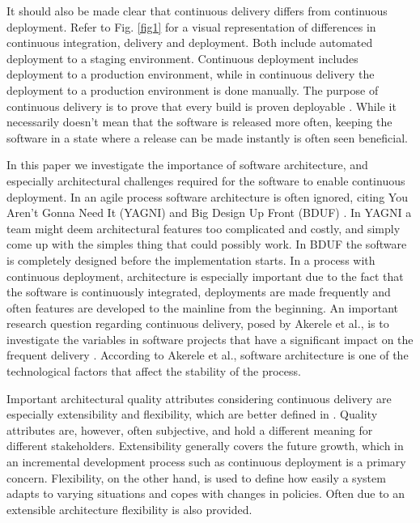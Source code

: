 \documentclass[conference]{IEEEtran}
\begin{document}
It should also be made clear that continuous delivery differs from continuous deployment. Refer to Fig. \ref{fig1} for a visual representation of differences in continuous integration, delivery and deployment. Both include automated deployment to a staging environment. Continuous deployment includes deployment to a production environment, while in continuous delivery the deployment to a production environment is done manually. The purpose of continuous delivery is to prove that every build is proven deployable \cite{cdbook}. While it necessarily doesn't mean that the software is released more often, keeping the software in a state where a release can be made instantly is often seen beneficial.

In this paper we investigate the importance of software architecture, and especially architectural challenges required for the software to enable continuous deployment. In an agile process software architecture is often ignored, citing You Aren't Gonna Need It (YAGNI) and Big Design Up Front (BDUF) \cite{kruchten2010software}. In YAGNI a team might deem architectural features too complicated and costly, and simply come up with the simples thing that could possibly work. In BDUF the software is completely designed before the implementation starts. In a process with continuous deployment, architecture is especially important due to the fact that the software is continuously integrated, deployments are made frequently and often features are developed to the mainline from the beginning. An important research question regarding continuous delivery, posed by Akerele et al., is to investigate the variables in software projects that have a significant impact on the frequent delivery \cite{6612879}. According to Akerele et al., software architecture is one of the technological factors that affect the stability of the process. 

Important architectural quality attributes considering continuous delivery are especially extensibility and flexibility, which are better defined in \cite{kaisler2005software}. Quality attributes are, however, often subjective, and hold a different meaning for different stakeholders. Extensibility generally covers the future growth, which in an incremental development process such as continuous deployment is a primary concern. Flexibility, on the other hand, is used to define how easily a system adapts to varying situations and copes with changes in policies. Often due to an extensible architecture flexibility is also provided. 
\end{document}
